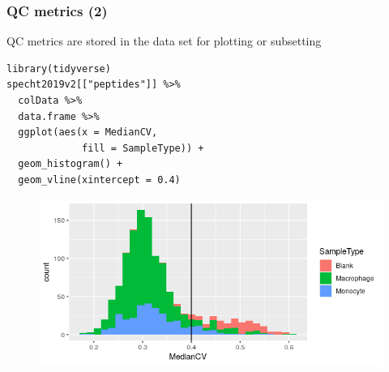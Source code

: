\documentclass{beamer}
\newcommand{\frametitlesection}[1]{\frametitle{\centering #1 \footnotesize \hspace{0pt plus 1 filll} \insertsection}}
\begin{document}
\begin{frame}[fragile]
    \frametitlesection{QC metrics (2)}

    QC metrics are stored in the data set for plotting or subsetting

    \begin{lstlisting}[basicstyle = \scriptsize\ttfamily\color{vdgray}]
library(tidyverse)
specht2019v2[["peptides"]] %>%
  colData %>%
  data.frame %>%
  ggplot(aes(x = MedianCV,
             fill = SampleType)) +
  geom_histogram() +
  geom_vline(xintercept = 0.4)
    \end{lstlisting}

    \begin{figure}
        \centering
        \includegraphics[width=.7\linewidth]{figs/medianCV.png}
    \end{figure}
\end{frame}
\end{document}
